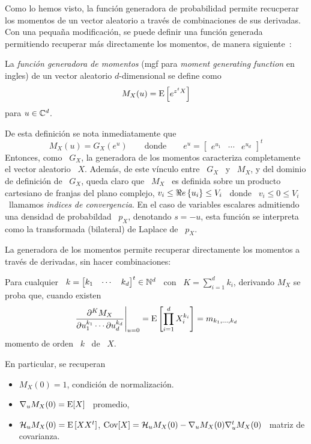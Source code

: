 
\label{Ssec:MP:GeneradoraMomentos}


Como lo hemos visto, la  funci\'on generadora de probabilidad permite recucperar
los  momentos  de  un  vector  aleatorio  a trav\'es  de  combinaciones  de  sus
derivadas.   Con una pequa\~na  modificaci\'on, se  puede definir  una funci\'on
generada  permitiendo  recuperar  m\'as  directamente los  momentos,  de  manera
siguiente~\cite{Fel68, JohKot97, Muk00, AthLah06}:
%
\begin{definicion}
\label{Def:MP:GeneradoraMomentos}
%
  La {\em  funci\'on generadora  de momentos} (mgf  para {\em  moment generating
    function} en ingles) de un vector aleatorio $d$-dimensional se define como
  \[
  M_X(u) = \operatorname{E}\left[ e^{z^t X} \right]
  \]
  para $u \in \mathbb{C}^d$.
\end{definicion}
%
De esta definici\'on se nota inmediatamente que
%
\[
M_X(u) = G_X\left( e^u \right)  \qquad \mbox{donde} \qquad e^u = \begin{bmatrix}
  e^{u_1} & \cdots & e^{u_d} \end{bmatrix}^t
\]
%
Entonces, como \ $G_X$, la  generadora de los momentos caracteriza completamente
el vector  aleatorio \ $X$.   Adem\'as, de  este v\'inculo entre  \ $G_X$ \  y \
$M_X$, y del  dominio de definici\'on de \  $G_X$, queda claro que \  $M_X$ \ es
definida sobre un  producto cartesiano de franjas del plano  complejo, $ v_i \le
\Re e \left\{ u_i \right\} \le  V_i$ \ donde \  $v_i \le 0 \le  V_i$ \ llamamos  {\em indices de
  convergencia}.  En el  caso de variables escalares admitiendo  una densidad de
probabildad \  $p_X$, denotando $s =  -u$, esta funci\'on se  interpreta como la
transformada (bilateral) de Laplace de \ $p_X$.


La  generadora de  los momentos  permite recuperar  directamente los  momentos a
trav\'es de derivadas, sin hacer combinaciones:
%
\begin{lema}
\label{Lem:MP:GenracionMomentos}
%
  Para cualquier \  $k = \begin{bmatrix} k_1 & \cdots  & k_d \end{bmatrix}^t \in
  \mathbb{N}^d$ \ con \ $K =  \sum_{i=1}^d k_i$, derivando $M_X$ se proba que, cuando
  existen
  \[
  \left.\frac{\partial^K     M_X}{\partial     u_1^{k_1}     \cdots     \partial
      u_d^{k_d}}\right|_{u=0}  = \operatorname{E}\left[  \prod_{i=1}^d  X_i^{k_i} \right]  =
  m_{k_1,\ldots,k_d}
  \]
  momento de orden \ $k$ \ de \ $X$.
\end{lema}
%
En particular, se recuperan
%
\begin{itemize}
\item $M_X(0) = 1$, condici\'on de normalizaci\'on.
%
\item $\nabla_u M_X(0) = \operatorname{E}[X]$ \ promedio,
%
\item $\mathcal{H}_u M_X(0) = \operatorname{E}\left[ X X^t \right]$, \ie $\operatorname{Cov}[X] = \mathcal{H}_u M_X(0)
  - \nabla_u M_X(0) \nabla_u^t M_X(0)$ \ matriz de covarianza.
\end{itemize}

